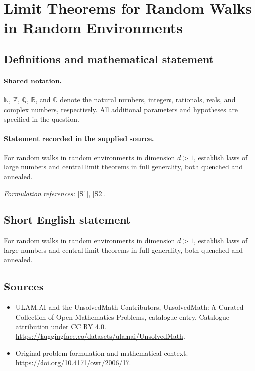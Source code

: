 \documentclass[11pt]{article}
\newcommand{\sref}[2]{\hyperlink{source:#1:#2}{[S#2]}}
\begin{document}
\section{Limit Theorems for Random Walks in Random Environments}\label{statement}

\subsection{Definitions and mathematical statement}

\paragraph{Shared notation.}$\mathbb N$, $\mathbb Z$, $\mathbb Q$, $\mathbb R$, and $\mathbb C$ denote the natural numbers, integers, rationals, reals, and complex numbers, respectively. All additional parameters and hypotheses are specified in the question.


\paragraph{Statement recorded in the supplied source.}
For random walks in random environments in dimension $d>1$, establish laws of large numbers and central limit theorems in full generality, both quenched and annealed.
\par\smallskip\textit{Formulation references:} \sref{statement}{1}, \sref{statement}{2}.
\subsection{Short English statement}
For random walks in random environments in dimension $d>1$, establish laws of large numbers and central limit theorems in full generality, both quenched and annealed.
\subsection{Sources}
\begin{itemize}
\item[\hypertarget{source:statement:1}{S1}] ULAM.AI and the UnsolvedMath Contributors, UnsolvedMath: A Curated Collection of Open Mathematics Problems, catalogue entry. Catalogue attribution under CC BY 4.0.
\url{https://huggingface.co/datasets/ulamai/UnsolvedMath}.
\item[\hypertarget{source:statement:2}{S2}] Original problem formulation and mathematical context.
\url{https://doi.org/10.4171/owr/2006/17}.
\end{itemize}
\label{end:statement}
\end{document}
